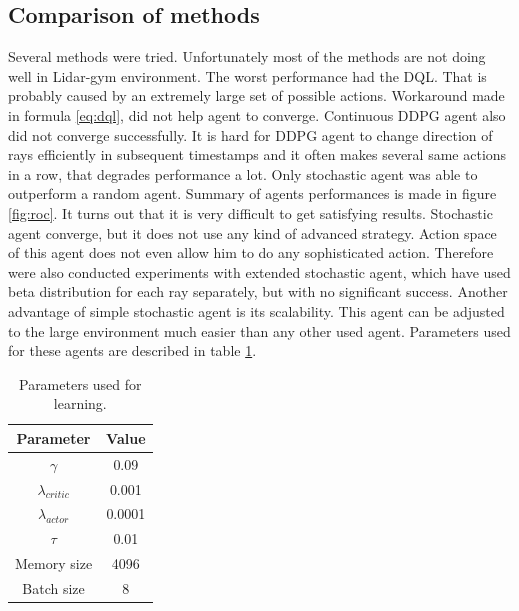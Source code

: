\subsection{Comparison of methods}
Several methods were tried. Unfortunately most of the methods are not doing well in Lidar-gym environment. The worst performance had the DQL. That is probably caused by an extremely large set of possible actions. Workaround made in formula \eqref{eq:dql}, did not help agent to converge. Continuous DDPG agent also did not converge successfully. It is  hard for DDPG agent to change direction of rays efficiently in subsequent timestamps and it often makes several same actions in a row, that degrades performance a lot. Only stochastic agent was able to outperform a random agent. Summary of agents performances is made in figure \ref{fig:roc}. It turns out that it is very difficult to get satisfying results. Stochastic agent converge, but it does not use any kind of advanced strategy. Action space of this agent does not even allow him to do any sophisticated action. Therefore were also conducted experiments with extended stochastic agent, which have used beta distribution for each ray separately, but with no significant success. Another advantage of simple stochastic agent is its scalability. This agent can be adjusted to the large environment much easier than any other used agent. Parameters used for these agents are described in table \ref{tab:params}.

\clearpage

\begin{table}[h!]
  \centering
  \begin{tabular}{*{2}{c}}
    \toprule
    Parameter & Value \\
    \midrule
    $\gamma$ & 0.09 \\
    $\lambda_{critic}$ & 0.001 \\
    $\lambda_{actor}$ & 0.0001 \\
    $\tau$ & 0.01 \\
    Memory size & 4096 \\
    Batch size & 8 \\
    \bottomrule
  \end{tabular}
  \caption[Learning parameters]{Parameters used for learning.}
  \label{tab:params}
\end{table}

